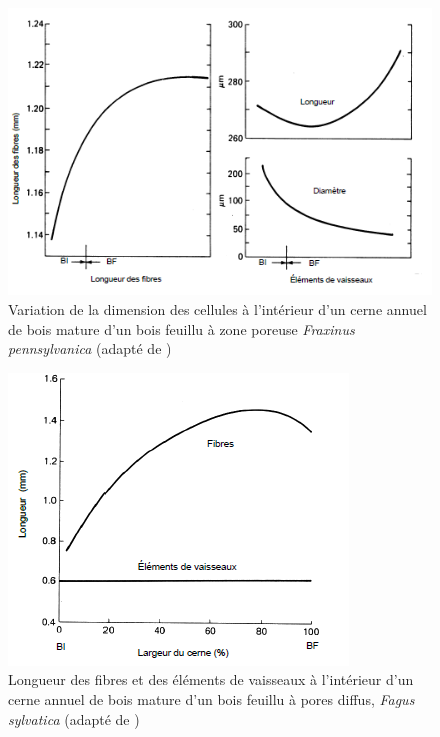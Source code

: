 \begin{figure}[h]
	\centering
	\includegraphics[scale=0.7]{img/ch7_long_fibres_cerne}
	\caption{Variation de la dimension des cellules à l'intérieur d'un cerne annuel de bois mature d'un bois feuillu à zone poreuse \textit{Fraxinus pennsylvanica} (adapté de \cite{panshin1980textbook})}
	\label{fig:long_fibres_cerne}
\end{figure}

\begin{figure}[h]
	\centering
	\includegraphics[scale=0.8]{img/ch7_long_diffus_cerne}
	\caption{Longueur des fibres et des éléments de vaisseaux à l'intérieur d’un cerne annuel de bois mature d'un bois feuillu à pores diffus, \textit{Fagus sylvatica} (adapté de \cite{panshin1980textbook})}
	\label{fig:long_diffus_cerne}
\end{figure}


